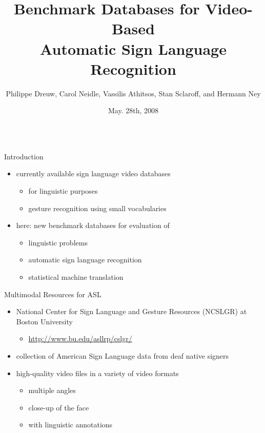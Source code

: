 \documentclass[final]{beamer}
\title{\Huge Benchmark Databases for Video-Based\\[0.5ex] Automatic Sign Language Recognition}
\author{Philippe Dreuw\inst{1}, Carol Neidle\inst{2}, Vassilis Athitsos\inst{3}, Stan Sclaroff\inst{2}, and Hermann Ney\inst{1}}
\institute[RWTH Aachen University] %
{
  \inst{1}%
  RWTH Aachen University, Aachen, Germany
  \\
  \inst{2}%
  Boston University, Boston, MA, USA
  \\
  \inst{3}%
  University of Texas, Arlington, TX, USA
}
\date[May. 28th, 2008]{May. 28th, 2008}
\begin{document}
\begin{frame}{} 
\vspace{-1cm}
\begin{columns}[t]
  \begin{column}{.45\linewidth}
    
    \begin{block}{Introduction}
      \begin{itemize}
      \item currently available sign language video databases
        \begin{itemize}
        \item for linguistic purposes
        \item gesture recognition using small vocabularies
        \end{itemize}
      \item here: new benchmark databases for evaluation of
        \begin{itemize}
        \item linguistic problems
        \item automatic sign language recognition
        \item statistical machine translation
        \end{itemize}
      \end{itemize}
    \end{block}
    
    \begin{block}{Multimodal Resources for ASL}
      \begin{itemize}
      \item National Center for Sign Language and Gesture Resources (NCSLGR) at Boston University
        \begin{itemize}
        \item \url{http://www.bu.edu/asllrp/cslgr/}
        \end{itemize}
      \item collection of American Sign Language data from deaf native
        signers
      \item high-quality video files in a variety of video formats
        \begin{itemize}
        \item multiple angles
        \item close-up of the face
        \item with linguistic annotations
        \end{itemize}
      \end{itemize}


\end{block}
\end{column}
\end{columns}
\end{frame}
\end{document}
